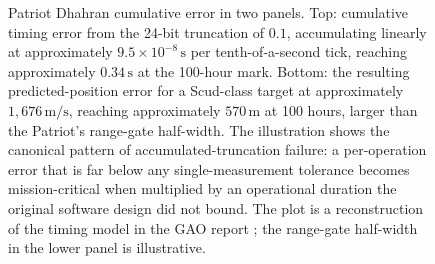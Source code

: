 \begin{figure}[p]
\begin{tikzpicture}[x=0.85cm, y=0.55cm, font=\footnotesize]
\end{tikzpicture}
\caption[Patriot Dhahran cumulative timing and position error]{Patriot
Dhahran cumulative error in two panels. Top: cumulative timing error
from the 24-bit truncation of $0.1$, accumulating linearly at
approximately $9.5 \times 10^{-8} \,\text{s}$ per tenth-of-a-second
tick, reaching approximately $0.34 \,\text{s}$ at the 100-hour mark.
Bottom: the resulting predicted-position error for a Scud-class target
at approximately $1{,}676 \,\text{m/s}$, reaching approximately
$570 \,\text{m}$ at 100 hours, larger than the Patriot's range-gate
half-width. The illustration shows the canonical pattern of
accumulated-truncation failure: a per-operation error that is far
below any single-measurement tolerance becomes mission-critical when
multiplied by an operational duration the original software design
did not bound. The plot is a reconstruction of the timing model in
the GAO report \cite{acc:gao-patriot-1992}; the range-gate half-width
in the lower panel is illustrative.}
\label{fig:vol02:ch16:patriot-drift}
\end{figure}
